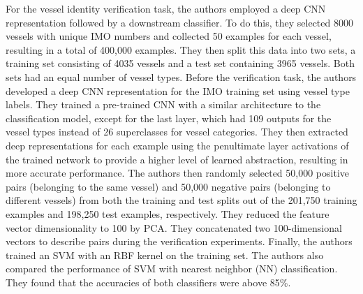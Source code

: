 For the vessel identity verification task, the authors employed a deep CNN representation followed by a downstream classifier. To do this, they selected 8000 vessels with unique IMO numbers and collected 50 examples for each vessel, resulting in a total of 400,000 examples. They then split this data into two sets, a training set consisting of 4035 vessels and a test set containing 3965 vessels. Both sets had an equal number of vessel types. Before the verification task, the authors developed a deep CNN representation for the IMO training set using vessel type labels. They trained a pre-trained CNN with a similar architecture to the classification model, except for the last layer, which had 109 outputs for the vessel types instead of 26 superclasses for vessel categories. They then extracted deep representations for each example using the penultimate layer activations of the trained network to provide a higher level of learned abstraction, resulting in more accurate performance. The authors then randomly selected 50,000 positive pairs (belonging to the same vessel) and 50,000 negative pairs (belonging to different vessels) from both the training and test splits out of the 201,750 training examples and 198,250 test examples, respectively. They reduced the feature vector dimensionality to 100 by PCA. They concatenated two 100-dimensional vectors to describe pairs during the verification experiments. Finally, the authors trained an SVM with an RBF kernel on the training set. The authors also compared the performance of SVM with nearest neighbor (NN) classification. They found that the accuracies of both classifiers were above 85\%.
\\

